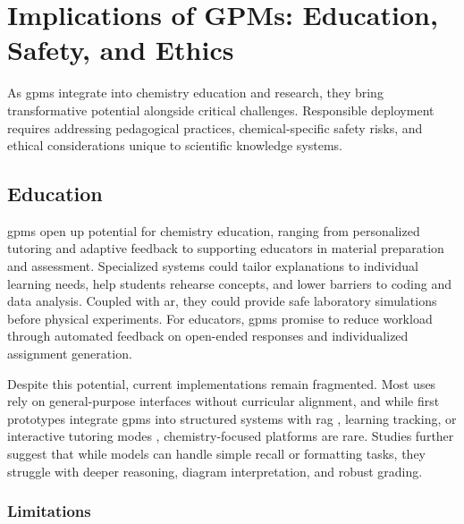 \section{Implications of GPMs: Education, Safety, and Ethics}
\label{sec:implications}

As \glspl{gpm} integrate into chemistry education and research, they bring transformative potential alongside critical challenges. Responsible deployment requires addressing pedagogical practices, chemical-specific safety risks, and ethical considerations unique to scientific knowledge systems.


\subsection{Education} \label{sec:education}

\glspl{gpm} open up potential for chemistry education, ranging from personalized tutoring and adaptive feedback to supporting educators in material preparation and assessment. \autocite{Mollick2024}
Specialized systems could tailor explanations to individual learning needs, help students rehearse concepts, and lower barriers to coding and data analysis.\autocite{Mollick2024, Sharma2025role, Du2024} Coupled with \gls{ar}, they could provide safe laboratory simulations before physical experiments. For educators, \glspl{gpm} promise to reduce workload through automated feedback on open-ended responses and individualized assignment generation.\autocite{Kortemeyer2024, gao2024towards}


Despite this potential, current implementations remain fragmented. Most uses rely on general-purpose interfaces without curricular alignment\autocite{Subasinghe2025, Tsai2023, shao2025unlocking}, and while first prototypes integrate \glspl{gpm} into structured systems with \gls{rag} \autocite{perez2025large, Jablonka2023}, learning tracking, or interactive tutoring modes \autocite{li2025tutorllm0, wang2025learnmate0, AnthropicEducation}, chemistry-focused platforms are rare. 
Studies further suggest that while models can handle simple recall or formatting tasks, they struggle with deeper reasoning, diagram interpretation, and robust grading.\autocite{handa2025education, baral2025drawedumath0, kharchenko2024advantages} 

\subsubsection{Limitations}

